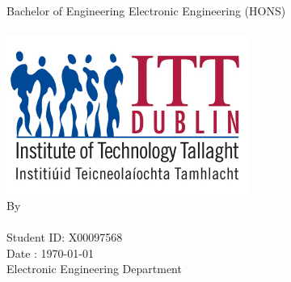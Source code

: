 \begin{titlepage}
	\begin{center}	
		\makeatletter
		{\LARGE Bachelor of Engineering Electronic Engineering (HONS)}\\[2cm]  
		{\huge \textbf{\@title}}\\[3cm] 
		\includegraphics [scale =2]{../Photo/itt-logo} \\[3cm]   
		{\large By} \\[1cm] 
		{\LARGE \@author}\\[1cm] 
		 Student ID: X00097568\\[1cm]  		 
		Date : \today \\[1cm]
	    Electronic Engineering Department \\
	\end{center}
\end{titlepage}




 
